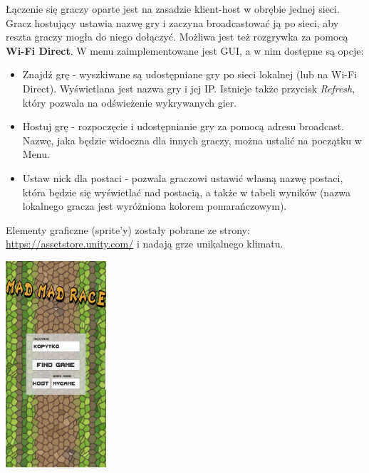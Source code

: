 \documentclass[]{report}
\begin{document}
Łączenie się graczy oparte jest na zasadzie klient-host w obrębie jednej sieci. Gracz hostujący ustawia nazwę gry i zaczyna broadcastować ją po sieci, aby reszta graczy mogła do niego dołączyć. Możliwa jest też rozgrywka za pomocą \textbf{Wi-Fi Direct}. W menu zaimplementowane jest GUI, a w nim dostępne są opcje:
\begin{itemize}
	\item Znajdź grę - wyszkiwane są udostępniane gry po sieci lokalnej (lub na Wi-Fi Direct). Wyświetlana jest nazwa gry i jej IP. Istnieje także przycisk \textit{Refresh}, który pozwala na odświeżenie wykrywanych gier.
	\item Hostuj grę - rozpoczęcie i udostępnianie gry za pomocą adresu broadcast. Nazwę, jaka będzie widoczna dla innych graczy, można ustalić na początku w Menu.
	\item Ustaw nick dla postaci - pozwala graczowi ustawić własną nazwę postaci, która będzie się wyświetlać nad postacią, a także w tabeli wyników (nazwa lokalnego gracza jest wyróżniona kolorem pomarańczowym).
\end{itemize}
Elementy graficzne (sprite'y) zostały pobrane ze strony: 
\href{https://assetstore.unity.com/}{https://assetstore.unity.com/} i nadają grze unikalnego klimatu.
\bigskip
\begin{center}
	\includegraphics[width=0.28\textwidth]{g1.jpg}
\end{center}
\end{document}
